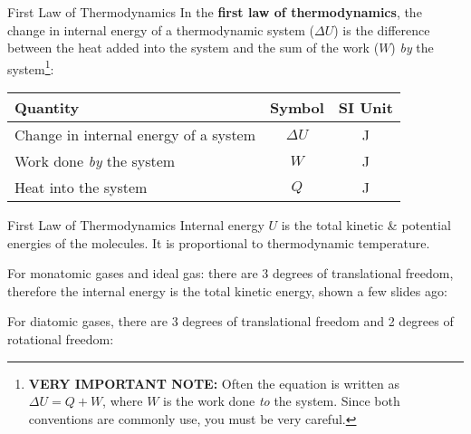 \documentclass[12pt,aspectratio=169]{beamer}
\newcommand{\eq}[2]{\vspace{#1}{\Large\begin{displaymath}#2\end{displaymath}}}
\begin{document}
\begin{frame}{First Law of Thermodynamics}
  In the \textbf{first law of thermodynamics}, the change in internal energy of
  a thermodynamic system ($\Delta U$) is the difference between the heat added
  into the system and the sum of the work ($W$) \emph{by} the
  system\footnote{\textbf{VERY IMPORTANT NOTE:} Often the equation is written
    as $\Delta U=Q+W$, where $W$ is the work done \emph{to} the system. Since
    both conventions are commonly use, you must be very careful.}:
  
  \eq{-.2in}{
    \boxed{\Delta U=Q-W}
  }
  \begin{center}
    \begin{tabular}{l|c|c}
      \rowcolor{pink}
      \textbf{Quantity} & \textbf{Symbol} & \textbf{SI Unit} \\ \hline
      Change in internal energy of a system & $\Delta U$   & \si{\joule} \\
      Work done \emph{by} the system & $W$                 & \si{\joule} \\
      Heat into the system           & $Q$                 & \si{\joule}
    \end{tabular}
  \end{center}
\end{frame}


\begin{frame}{First Law of Thermodynamics}
  Internal energy $U$ is the total kinetic \& potential energies of the
  molecules. It is proportional to thermodynamic temperature.

  \eq{-.25in}{
    \boxed{\Delta\textcolor{red}{U}=Q-W}
  }

  \vspace{-.1in}For monatomic gases and ideal gas: there are 3 degrees of
  translational freedom, therefore the internal energy is the total kinetic
  energy, shown a few slides ago:

  \eq{-.25in}{
    U=\frac32Nk_BT
  }

  For diatomic gases, there are 3 degrees of translational freedom and 2
  degrees of rotational freedom:

    \eq{-.32in}{
      U=\frac52Nk_BT
    }
\end{frame}
\end{document}
